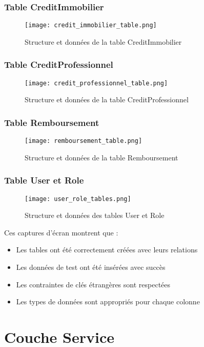 \subsubsection{Table CreditImmobilier}
\begin{figure}[H]
    \centering
    \texttt{[image: credit\_immobilier\_table.png]}
    \caption{Structure et données de la table CreditImmobilier}
\end{figure}

\subsubsection{Table CreditProfessionnel}
\begin{figure}[H]
    \centering
    \texttt{[image: credit\_professionnel\_table.png]}
    \caption{Structure et données de la table CreditProfessionnel}
\end{figure}

\subsubsection{Table Remboursement}
\begin{figure}[H]
    \centering
    \texttt{[image: remboursement\_table.png]}
    \caption{Structure et données de la table Remboursement}
\end{figure}

\subsubsection{Table User et Role}
\begin{figure}[H]
    \centering
    \texttt{[image: user\_role\_tables.png]}
    \caption{Structure et données des tables User et Role}
\end{figure}

Ces captures d'écran montrent que :
\begin{itemize}
    \item Les tables ont été correctement créées avec leurs relations
    \item Les données de test ont été insérées avec succès
    \item Les contraintes de clés étrangères sont respectées
    \item Les types de données sont appropriés pour chaque colonne
\end{itemize}

\section{Couche Service}
